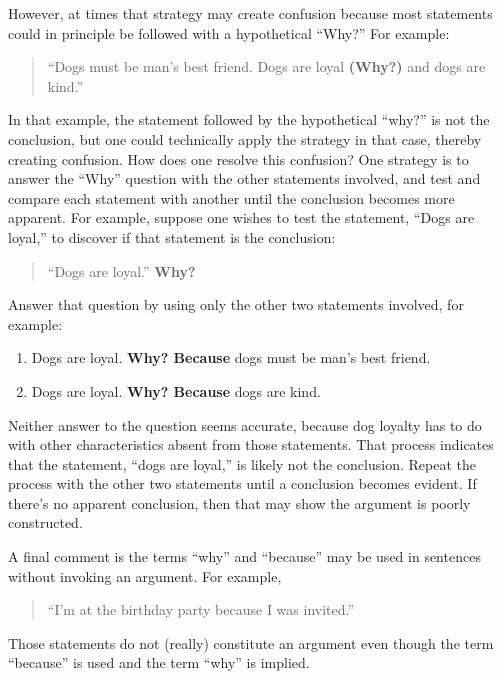 \documentclass[
]{book}
\providecommand{\tightlist}{%
  \setlength{\itemsep}{0pt}\setlength{\parskip}{0pt}}
\begin{document}
However, at times that strategy may create confusion because most statements could in principle be followed with a hypothetical ``Why?'' For example:

\begin{quote}
``Dogs must be man's best friend. Dogs are loyal \textbf{(Why?)} and dogs are kind.''
\end{quote}

In that example, the statement followed by the hypothetical ``why?'' is not the conclusion, but one could technically apply the strategy in that case, thereby creating confusion. How does one resolve this confusion? One strategy is to answer the ``Why'' question with the other statements involved, and test and compare each statement with another until the conclusion becomes more apparent. For example, suppose one wishes to test the statement, ``Dogs are loyal,'' to discover if that statement is the conclusion:

\begin{quote}
``Dogs are loyal.'' \textbf{Why?}
\end{quote}

Answer that question by using only the other two statements involved, for example:

\begin{enumerate}
\def\labelenumi{\arabic{enumi}.}
\tightlist
\item
  Dogs are loyal. \textbf{Why? Because} dogs must be man's best friend.\\
\item
  Dogs are loyal. \textbf{Why? Because} dogs are kind.
\end{enumerate}

Neither answer to the question seems accurate, because dog loyalty has to do with other characteristics absent from those statements. That process indicates that the statement, ``dogs are loyal,'' is likely not the conclusion. Repeat the process with the other two statements until a conclusion becomes evident. If there's no apparent conclusion, then that may show the argument is poorly constructed.

A final comment is the terms ``why'' and ``because'' may be used in sentences without invoking an argument. For example,

\begin{quote}
``I'm at the birthday party because I was invited.''
\end{quote}

Those statements do not (really) constitute an argument even though the term ``because'' is used and the term ``why'' is implied.
\end{document}
